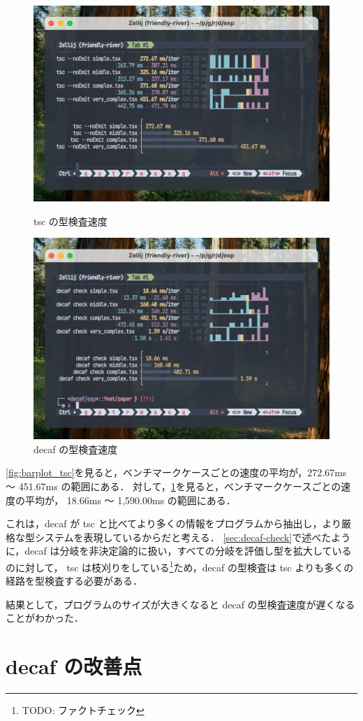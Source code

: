 \begin{figure}[H]
    \centering
    \begin{minipage}[b]{0.49\columnwidth}
        \includegraphics[width=\columnwidth]{figures/fig_exp_1_tsc_barplot.png}
        \caption{tsc の型検査速度}
        \label{fig:barplot_tsc}
    \end{minipage}
    \begin{minipage}[b]{0.49\columnwidth}
        \includegraphics[width=\columnwidth]{figures/fig_exp_1_decaf_barplot.png}
        \caption{decaf の型検査速度}
        \label{fig:barplot_decaf}
    \end{minipage}
\end{figure}

\ref{fig:barplot_tsc}を見ると，ベンチマークケースごとの速度の平均が，272.67ms 〜 451.67ms の範囲にある．
対して，\ref{fig:barplot_decaf}を見ると，ベンチマークケースごとの速度の平均が， 18.66ms 〜 1,590.00ms の範囲にある．

これは，decaf が tsc と比べてより多くの情報をプログラムから抽出し，より厳格な型システムを表現しているからだと考える．
\ref{sec:decaf-check}で述べたように，decaf は分岐を非決定論的に扱い，すべての分岐を評価し型を拡大しているのに対して，
tsc は枝刈りをしている\footnote{TODO: ファクトチェック}ため，decaf の型検査は tsc よりも多くの経路を型検査する必要がある．

結果として，プログラムのサイズが大きくなると decaf の型検査速度が遅くなることがわかった．

\section{decaf の改善点}
